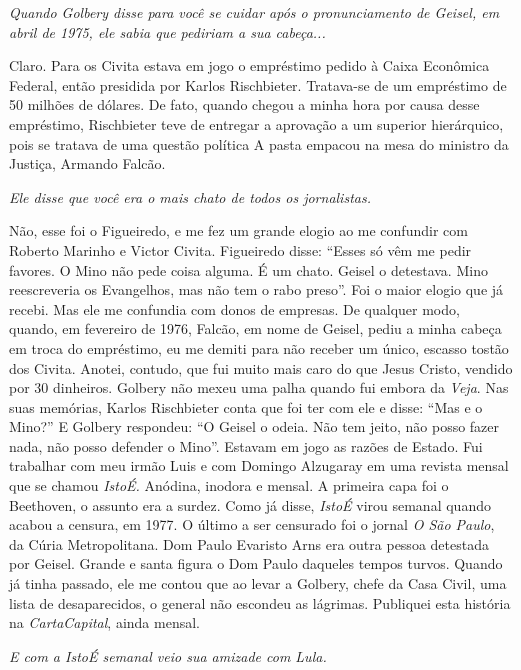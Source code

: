 \itshape
 Quando Golbery disse para você se cuidar após o
pronunciamento de Geisel, em abril de 1975, ele sabia que pediriam a sua
cabeça...

\normalfont
Claro. Para os Civita estava em jogo o empréstimo pedido
à Caixa Econômica Federal, então presidida por Karlos Rischbieter.
Tratava-se de um empréstimo de 50 milhões de dólares. De fato, quando
chegou a minha hora por causa desse empréstimo, Rischbieter teve de
entregar a aprovação a um superior hierárquico, pois se tratava de uma
questão política A pasta empacou na mesa do ministro da Justiça, Armando
Falcão.

\itshape
 Ele disse que você era o mais chato de todos os
jornalistas.

\normalfont
Não, esse foi o Figueiredo, e me fez um grande elogio ao
me confundir com Roberto Marinho e Victor Civita. Figueiredo disse:
``Esses só vêm me pedir favores. O Mino não pede coisa alguma. É um
chato. Geisel o detestava. Mino reescreveria os Evangelhos, mas não tem
o rabo preso''. Foi o maior elogio que já recebi. Mas ele me confundia
com donos de empresas. De qualquer modo, quando, em fevereiro de 1976,
Falcão, em nome de Geisel, pediu a minha cabeça em troca do empréstimo,
eu me demiti para não receber um único, escasso tostão dos Civita.
Anotei, contudo, que fui muito mais caro do que Jesus Cristo, vendido
por 30 dinheiros. Golbery não mexeu uma palha quando fui embora da
\emph{Veja}. Nas suas memórias, Karlos Rischbieter conta que foi ter com
ele e disse: ``Mas e o Mino?'' E Golbery respondeu: ``O Geisel o odeia.
Não tem jeito, não posso fazer nada, não posso defender o Mino''.
Estavam em jogo as razões de Estado. Fui trabalhar com meu irmão Luis e
com Domingo Alzugaray em uma revista mensal que se chamou \emph{IstoÉ.}
Anódina, inodora e mensal. A primeira capa foi o Beethoven, o assunto
era a surdez. Como já disse, \emph{IstoÉ} virou semanal quando acabou a
censura, em 1977. O último a ser censurado foi o jornal \emph{O São
Paulo}, da Cúria Metropolitana. Dom Paulo Evaristo Arns era outra pessoa
detestada por Geisel. Grande e santa figura o Dom Paulo daqueles tempos
turvos. Quando já tinha passado, ele me contou que ao levar a Golbery,
chefe da Casa Civil, uma lista de desaparecidos, o general não escondeu
as lágrimas. Publiquei esta história na \emph{CartaCapital}, ainda
mensal.

\itshape
 E com a \emph{IstoÉ} semanal veio sua amizade com Lula.

